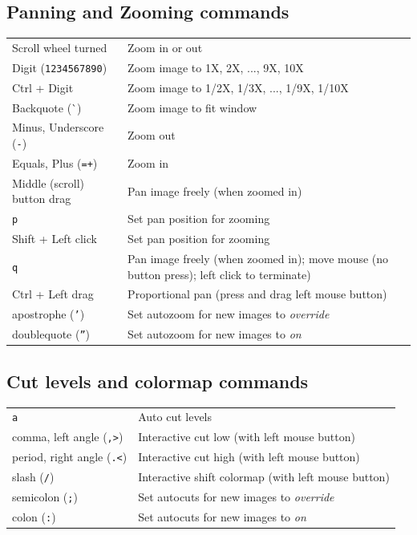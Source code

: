 \documentclass[11pt]{report}
\begin{document}
\subsection{Panning and Zooming commands}
\begin{tabularx}{\textwidth}{lX}
Scroll wheel turned & Zoom in or out \\
Digit ({\tt 1234567890}) & Zoom image to 1X, 2X, ..., 9X, 10X \\
Ctrl + Digit & Zoom image to 1/2X, 1/3X, ..., 1/9X, 1/10X \\
Backquote (\`{}) & Zoom image to fit window \\
Minus, Underscore ({\tt -\textunderscore{}}) & Zoom out \\
Equals, Plus ({\tt =+}) & Zoom in \\
Middle (scroll) button drag & Pan image freely (when zoomed in) \\
{\tt p} & Set pan position for zooming \\
Shift + Left click & Set pan position for zooming \\
{\tt q} & Pan image freely (when zoomed in); move mouse (no button press); left click to terminate) \\
Ctrl + Left drag & Proportional pan (press and drag left mouse button) \\
apostrophe ({\tt '}) & Set autozoom for new images to {\em override} \\
doublequote ({\tt ''}) & Set autozoom for new images to {\em on} \\
\end{tabularx}

\subsection{Cut levels and colormap commands}
\begin{tabularx}{\textwidth}{lX}
{\tt a} & Auto cut levels \\
comma, left angle ({\tt ,\textgreater{}}) & Interactive cut low (with left mouse button) \\ 
period, right angle ({\tt .\textless{}}) & Interactive cut high (with left mouse
button) \\ 
slash ({\tt /}) & Interactive shift colormap (with left mouse button) \\
semicolon ({\tt ;}) & Set autocuts for new images to {\em override} \\
colon ({\tt :}) & Set autocuts for new images to {\em on} \\
\end{tabularx}
\end{document}
